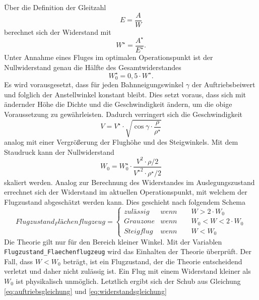 Über die Definition der Gleitzahl 
\begin{equation}
	E = \frac{A}{W}
\end{equation}
berechnet sich der Widerstand mit
\begin{equation}
	W^\star = \frac{A^\star}{E^\star} .
\end{equation}
Unter Annahme eines Fluges im optimalen Operationspunkt ist der Nullwiderstand genau die Hälfte des Gesamtwiderstandes
\begin{equation}
	W_0^\star = 0,5\cdot W^\star .
\end{equation}
Es wird vorausgesetzt, dass für jeden Bahnneigungswinkel \ensuremath{\gamma} der Auftriebsbeiwert und folglich der Anstellwinkel konstant bleibt. Dies setzt voraus, dass sich mit ändernder Höhe die Dichte und die Geschwindigkeit ändern, um die obige Voraussetzung zu gewährleisten. Dadurch verringert sich die Geschwindigkeit
\begin{equation}
	V = V^\star\cdot\sqrt{\cos\gamma\cdot\frac{\rho}{\rho^\star}}  \label{eq:geschw_flaechenflugzeug}
\end{equation}
analog mit einer Vergrößerung der Flughöhe und des Steigwinkels. Mit dem Staudruck kann der Nullwiderstand 
\begin{equation}
	W_0 = W_0^\star\cdot\frac{V^2\cdot\rho/2}{{V^\star}^2\cdot\rho^\star/2}
\end{equation}
skaliert werden.
Analog zur Berechnung des Widerstandes im Auslegungszustand errechnet sich der Widerstand im aktuellen Operationspunkt, mit welchem der Flugzustand abgeschätzt werden kann. Dies geschieht nach folgendem Schema
\begin{equation}
Flugzustand_Flächenflugzeug = \begin{cases} 
zulässig & wenn \qquad W > 2\cdot W_0 \\ 
Grauzone & wenn \qquad W_0 < W < 2\cdot W_0 \\ 
Steigflug & wenn \qquad W < W_0 
\end{cases}
\end{equation} 
Die Theorie gilt nur für den Bereich kleiner Winkel. Mit der Variablen \texttt{Flugzustand\_Flaechenflugzeug} wird das Einhalten der Theorie überprüft. Der Fall, dass \ensuremath{W < W_0} beträgt, ist ein Flugzustand, der die Theorie entscheidend verletzt und daher nicht zulässig ist. Ein Flug mit einem Widerstand kleiner als \ensuremath{W_0} ist physikalisch unmöglich.
Letztlich ergibt sich der Schub aus Gleichung \ref{eq:auftriebsgleichung} und \ref{eq:widerstandsgleichung}
